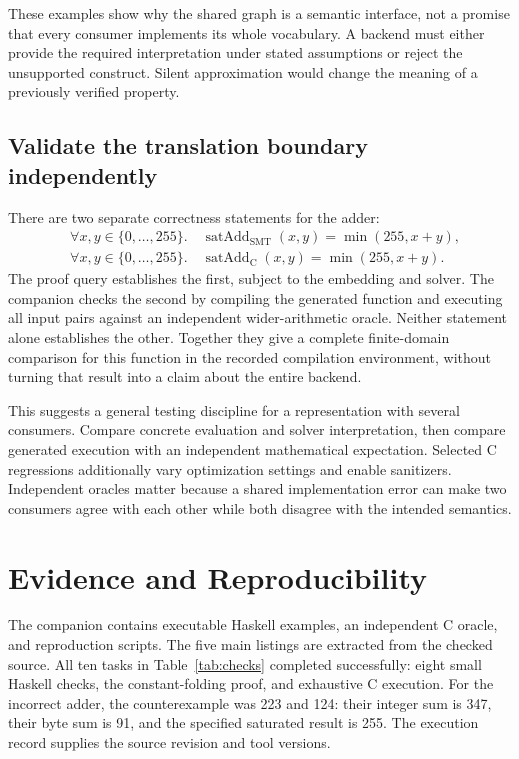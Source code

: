 \documentclass[acmsmall,screen,nonacm]{acmart}
\begin{document}
These examples show why the shared graph is a semantic interface, not a promise
that every consumer implements its whole vocabulary. A backend must either
provide the required interpretation under stated assumptions or reject the
unsupported construct. Silent approximation would change the meaning of a
previously verified property.

\subsection{Validate the translation boundary independently}

There are two separate correctness statements for the adder:
\begin{align*}
 &\forall x,y\in\{0,\ldots,255\}.\quad
   \operatorname{satAdd}_{\mathrm{SMT}}(x,y)=\min(255,x+y),\\
 &\forall x,y\in\{0,\ldots,255\}.\quad
   \operatorname{satAdd}_{\mathrm{C}}(x,y)=\min(255,x+y).
\end{align*}
The proof query establishes the first, subject to the embedding and solver.
The companion checks the second by compiling the generated function and
executing all input pairs against an independent wider-arithmetic oracle.
Neither statement alone establishes the other. Together they give a complete
finite-domain comparison for this function in the recorded compilation
environment, without turning that result into a claim about the entire backend.

This suggests a general testing discipline for a representation with several
consumers. Compare concrete evaluation and solver interpretation, then compare
generated execution with an independent mathematical expectation. Selected C
regressions additionally vary optimization settings and enable sanitizers.
Independent oracles matter because a shared implementation error can make two
consumers agree with each other while both disagree with the intended semantics.

\section{Evidence and Reproducibility}
\label{sec:evidence}

The companion contains executable Haskell examples, an independent C oracle,
and reproduction scripts. The five main listings are extracted from the checked
source. All ten tasks in Table~\ref{tab:checks} completed successfully: eight
small Haskell checks, the constant-folding proof, and exhaustive C execution.
For the incorrect adder, the counterexample was 223 and 124: their integer sum
is 347, their byte sum is 91, and the specified saturated result is 255.
The execution record supplies the source revision and tool versions.
\end{document}
